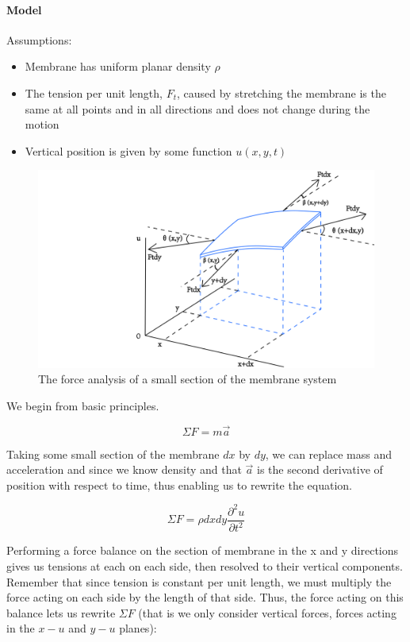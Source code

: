 \paragraph{Model}
Assumptions:
\begin{itemize}
	\item Membrane has uniform planar density $\rho$
    \item The tension per unit length, $F_t$, caused by stretching the membrane is the same at all points and in all directions and does not change during the motion
    \item Vertical position is given by some function $u(x,y,t)$
\end{itemize}
\begin{figure}[htb]
	\centering
	\includegraphics[width=15cm]{Figures/2D_waves_model.png}       
	\caption{The force analysis of a small section of the membrane system }
	\label{2D_waves_model.fig}
\end{figure}
We begin from basic principles.

$$\Sigma F = m\vec{a}$$

\noindent Taking some small section of the membrane $dx$ by $dy$, we can replace mass and acceleration and since we know density and that $\vec{a}$ is the second derivative of position with respect to time, thus enabling us to rewrite the equation.

\begin{equation}
\label{no_balance}
\Sigma F = \rho dxdy \frac{\partial^2u}{\partial t^2}
\end{equation}

\noindent Performing a force balance on the section of membrane in the x and y directions gives us tensions at each on each side, then resolved to their vertical components. Remember that since tension is constant per unit length, we must multiply the force acting on each side by the length of that side. Thus, the force acting on this balance lets us rewrite $\Sigma F$ (that is we only consider vertical forces, forces acting in the $x-u$ and $y-u$ planes): 

